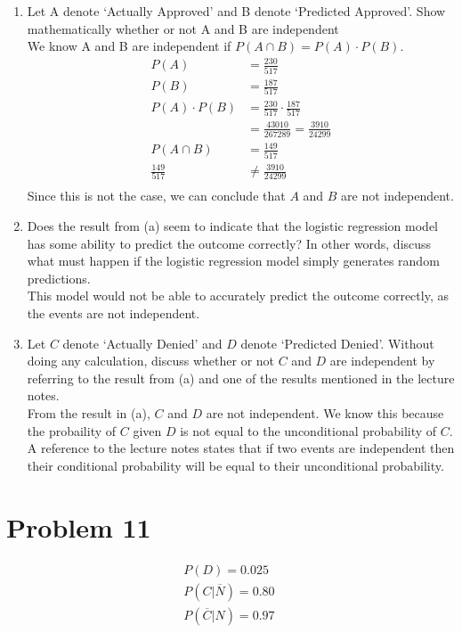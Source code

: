 \documentclass{article}
\begin{document}
\begin{enumerate}[label=\alph*)]
    \item Let A denote ‘Actually Approved’ and B denote ‘Predicted Approved’. Show
    mathematically whether or not A and B are independent \\
    We know A and B are independent if \(P(A \cap B) = P(A) \cdot P(B)\).
    \begin{align*}
        P(A) &= \frac{230}{517} \\
        P(B) &= \frac{187}{517} \\
        P(A) \cdot P(B) &= \frac{230}{517} \cdot \frac{187}{517} \\
        &= \frac{43010}{267289} = \frac{3910}{24299} \\
        P(A \cap B) &= \frac{149}{517} \\   
        \frac{149}{517} &\neq \frac{3910}{24299} \\
    \end{align*}
    Since this is not the case, we can conclude that \(A\) and \(B\) are not independent.
    \item Does the result from (a) seem to indicate that the logistic regression model has some
    ability to predict the outcome correctly? In other words, discuss what must happen if the
    logistic regression model simply generates random predictions. \\
    This model would not be able to accurately predict the outcome correctly, as the events are not independent.
    \item Let \(C\) denote ‘Actually Denied’ and \(D\) denote ‘Predicted Denied’. Without doing any
    calculation, discuss whether or not \(C\) and \(D\) are independent by referring to the result from (a)
    and one of the results mentioned in the lecture notes. \\
    From the result in (a), \(C\) and \(D\) are not independent. We know this because the probaility of \(C\) given \(D\) is not equal to the unconditional probability of \(C\). A reference to the lecture notes states that if two events are independent then their conditional probability will be equal to their unconditional probability.
\end{enumerate}

\pagebreak

\section*{Problem 11}
\begin{align*}
    P(D) = 0.025 \\
    P(C \vert\overline{N}) = 0.80 \\
    P(\overline{C} \vert N) = 0.97\ \\
\end{align*}
\end{document}
